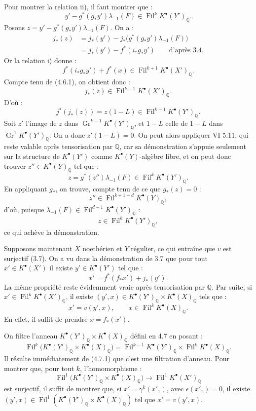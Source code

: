 \documentclass[11pt]{article}
\newcommand{\Fil}{\operatorname{Fil}}
\begin{document}
Pour montrer la relation ii), il faut montrer que :
\[
  y'-g^*(g_*y')\lambda_{-1}(F)\in\Fil^kK^\bullet(Y')_{\mathbb Q}.
\]
Posons \(z=y'-g^*(g_*y')\lambda_{-1}(F)\). On a :
\[
\begin{aligned}
j_*(z)
  &=j_*(y')-j_*\bigl(g^*(g_*y')\lambda_{-1}(F)\bigr)\\
  &=j_*(y')-f^*(i_*g_*y')\qquad\text{d'après 3.4.}
\end{aligned}
\]
Or la relation i) donne :
\[
  f^*(i_*g_*y')+f^*(x)\in\Fil^{k+1}K^\bullet(X')_{\mathbb Q}.
\]
Compte tenu de (4.6.1), on obtient donc :
\[
  j_*(z)\in\Fil^{k+1}K^\bullet(X')_{\mathbb Q}.
\]
D'où :
\[
  j^*(j_*(z))=z(1-L)\in\Fil^{k+1}K^\bullet(Y')_{\mathbb Q}.
\]
Soit \(z'\) l'image de \(z\) dans \(\operatorname{Gr}^{k-1}K^\bullet(Y')_{\mathbb Q}\), et \(1-L\) celle de \(1-L\) dans \(\operatorname{Gr}^{1}K^\bullet(Y')_{\mathbb Q}\). On a donc \(z'(1-L)=0\). On peut alors appliquer VI 5.11, qui reste valable après tensorisation par \(\mathbb Q\), car sa démonstration s'appuie seulement sur la structure de \(K^\bullet(Y')\) comme \(K^\bullet(Y)\)-algèbre libre, et on peut donc trouver \(z''\in K^\bullet(Y)_{\mathbb Q}\) tel que :
\[
  z=g^*(z'')\lambda_{-1}(F)\in\Fil^kK^\bullet(Y')_{\mathbb Q}.
\]
En appliquant \(g_*\), on trouve, compte tenu de ce que \(g_*(z)=0\) :
\[
  z''\in\Fil^{k+1-d}K^\bullet(Y)_{\mathbb Q},
\]
d'où, puisque \(\lambda_{-1}(F)\in\Fil^{d-1}K^\bullet(Y')_{\mathbb Q}\) :
\[
  z\in\Fil^kK^\bullet(Y')_{\mathbb Q},
\]
ce qui achève la démonstration.

Supposons maintenant \(X\) noethérien et \(Y\) régulier, ce qui entraîne que \(v\) est surjectif (3.7). On a vu dans la démonstration de 3.7 que pour tout \(x'\in K^\bullet(X')\) il existe \(y'\in K^\bullet(Y')\) tel que :
\[
  x'=f^*(f_*x')+j_*(y').
\]
La même propriété reste évidemment vraie après tensorisation par \(\mathbb Q\). Par suite, si \(x'\in\Fil^kK^\bullet(X')_{\mathbb Q}\), il existe \((y',x)\in K^\bullet(Y')_{\mathbb Q}\times K^\bullet(X)_{\mathbb Q}\) tels que :
\[
  x'=v(y',x),\qquad x\in\Fil^kK^\bullet(X)_{\mathbb Q}.
\]
En effet, il suffit de prendre \(x=f_*(x')\).

On filtre l'anneau \(K^\bullet(Y')_{\mathbb Q}\times K^\bullet(X)_{\mathbb Q}\) défini en 4.7 en posant :
\[
  \Fil^k\bigl(K^\bullet(Y')_{\mathbb Q}\times K^\bullet(X)_{\mathbb Q}\bigr)
  =
  \Fil^{k-1}K^\bullet(Y')_{\mathbb Q}\times \Fil^kK^\bullet(X)_{\mathbb Q}.
\]
Il résulte immédiatement de (4.7.1) que c'est une filtration d'anneau. Pour montrer que, pour tout \(k\), l'homomorphisme :
\[
  \Fil^1\bigl(K^\bullet(Y')_{\mathbb Q}\times K^\bullet(X)_{\mathbb Q}\bigr)
  \longrightarrow
  \Fil^1K^\bullet(X')_{\mathbb Q}
\]
est surjectif, il suffit de montrer que, si \(x'= \gamma^k(x'_1)\), avec \(\epsilon(x'_1)=0\), il existe \((y',x)\in\Fil^1(K^\bullet(Y')_{\mathbb Q}\times K^\bullet(X)_{\mathbb Q})\) tel que \(x'=v(y',x)\).
\end{document}

